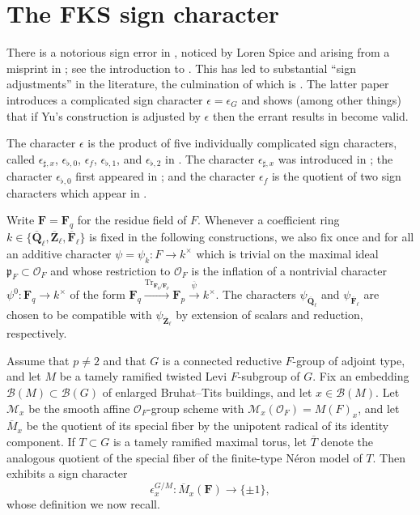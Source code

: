 \documentclass[reqno]{amsart}
\numberwithin{equation}{subsection}
\newcommand{\F}{\mathbf{F}}
\newcommand{\Q}{\mathbf{Q}}
\newcommand{\Z}{\mathbf{Z}}
\newcommand{\ol}[1]{\overline{#1}}
\newcommand{\co}{\colon}
\newcommand\cB{\mathcal{B}}
\newcommand\cM{\mathcal{M}}
\newcommand\cO{\mathcal{O}}
\newcommand\frp{\mathfrak{p}}
\DeclareMathOperator{\Tr}{Tr}
\theoremstyle{remark}
\numberwithin{equation}{subsection}
\numberwithin{figure}{subsection}
\begin{document}
\section{The FKS sign character}\label{sec:sign-characters}\label{ss:fks}

There is a notorious sign error in \cite{Yu01}, noticed by Loren Spice and arising from a misprint in \cite[Theorem 2.4(b)]{Ger77}; see the introduction to \cite{Fin21b}. This has led to substantial ``sign adjustments'' in the literature, the culmination of which is \cite{FKS23}. The latter paper introduces a complicated sign character $\epsilon = \epsilon_G$ and shows (among other things) that if Yu's construction is adjusted by $\epsilon$ then the errant results in \cite{Yu01} become valid.

The character $\epsilon$ is the product of five individually complicated sign characters, called $\epsilon_{\sharp,x}$, $\epsilon_{\flat,0}$, $\epsilon_f$, $\epsilon_{\flat,1}$, and $\epsilon_{\flat,2}$ in \cite{FKS23}. The character $\epsilon_{\sharp,x}$ was introduced in \cite[\S 4.3]{DS18}; the character $\epsilon_{\flat,0}$ first appeared in \cite[Proposition 5.27]{Kal21a}; and the character $\epsilon_f$ is the quotient of two sign characters which appear in \cite[Definition 4.7.3]{Kal19}. %

Write $\F=\F_q$ for the residue field of $F$. Whenever a coefficient ring $k \in \{\ol\Q_\ell,\ol\Z_\ell,\ol\F_\ell\}$ is fixed in the following constructions, we also fix once and for all an additive character $\psi = \psi_k\co F \to k^\times$ which is trivial on the maximal ideal $\frp_F \subset \cO_F$ and whose restriction to $\cO_F$ is the inflation of a nontrivial character $\psi^0\co \F_q \to k^\times$ of the form $\F_q \xrightarrow{\Tr_{\F_q/\F_p}} \F_p \xrightarrow{\ol\psi} k^\times$.
The characters $\psi_{\ol\Q_\ell}$ and $\psi_{\ol\F_\ell}$ are chosen to be compatible with $\psi_{\ol\Z_\ell}$ by extension of scalars and reduction, respectively. %


Assume that $p \neq 2$ and that $G$ is a connected reductive $F$-group of adjoint type, and let $M$ be a tamely ramified twisted Levi $F$-subgroup of $G$. Fix an embedding $\cB(M) \subset \cB(G)$ of enlarged Bruhat--Tits buildings, and let $x \in \cB(M)$. Let $\cM_x$ be the smooth affine $\cO_F$-group scheme with $\cM_x(\cO_F)=M(F)_x$, and let $\ol M_x$ be the quotient of its special fiber by the unipotent radical of its identity component. If $T\subset G$ is a tamely ramified maximal torus, let $\ol T$ denote the analogous quotient of the special fiber of the finite-type N\'eron model of $T$. Then \cite[Theorem 3.4]{FKS23} exhibits a sign character
\[
\epsilon_x^{G/M}\co \ol M_x(\F)\longrightarrow\{\pm1\},
\]
whose definition we now recall.
\end{document}
